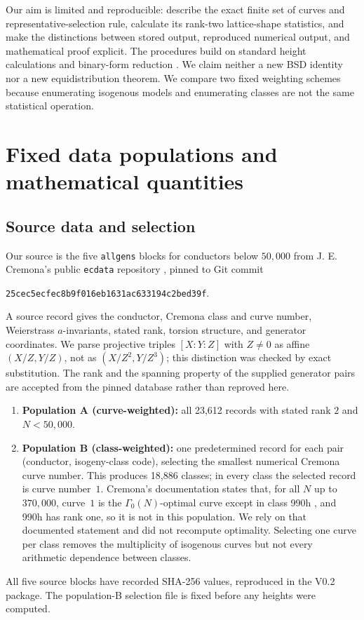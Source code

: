 \documentclass[11pt,a4paper]{article}
\begin{document}
Our aim is limited and reproducible: describe the exact finite set of curves and representative-selection rule, calculate its rank-two lattice-shape statistics, and make the distinctions between stored output, reproduced numerical output, and mathematical proof explicit. The procedures build on standard height calculations and binary-form reduction \cite{Cohen1993,Cremona1997,PARI}. We claim neither a new BSD identity nor a new equidistribution theorem. We compare two fixed weighting schemes because enumerating isogenous models and enumerating classes are not the same statistical operation.

\section{Fixed data populations and mathematical quantities}
\subsection{Source data and selection}
Our source is the five \texttt{allgens} blocks for conductors below $50{,}000$ from J. E. Cremona's public \texttt{ecdata} repository \cite{CremonaData}, pinned to Git commit
\begin{center}\small\texttt{25cec5ecfec8b9f016eb1631ac633194c2bed39f}.\end{center}
A source record gives the conductor, Cremona class and curve number, Weierstrass $a$-invariants, stated rank, torsion structure, and generator coordinates. We parse projective triples $[X:Y:Z]$ with $Z\ne0$ as affine $(X/Z,Y/Z)$, not as $(X/Z^2,Y/Z^3)$; this distinction was checked by exact substitution. The rank and the spanning property of the supplied generator pairs are accepted from the pinned database rather than reproved here.

\begin{enumerate}[leftmargin=*]
\item \textbf{Population A (curve-weighted):} all 23,612 records with stated rank $2$ and $N<50{,}000$.
\item \textbf{Population B (class-weighted):} one predetermined record for each pair (conductor, isogeny-class code), selecting the smallest numerical Cremona curve number. This produces 18,886 classes; in every class the selected record is curve number~$1$. Cremona's documentation states that, for all $N$ up to $370{,}000$, curve~$1$ is the $\Gamma_0(N)$-optimal curve except in class 990h \cite{CremonaDocs}, and 990h has rank one, so it is not in this population. We rely on that documented statement and did not recompute optimality. Selecting one curve per class removes the multiplicity of isogenous curves but not every arithmetic dependence between classes.
\end{enumerate}
All five source blocks have recorded SHA-256 values, reproduced in the V0.2 package. The population-B selection file is fixed before any heights were computed.
\end{document}
